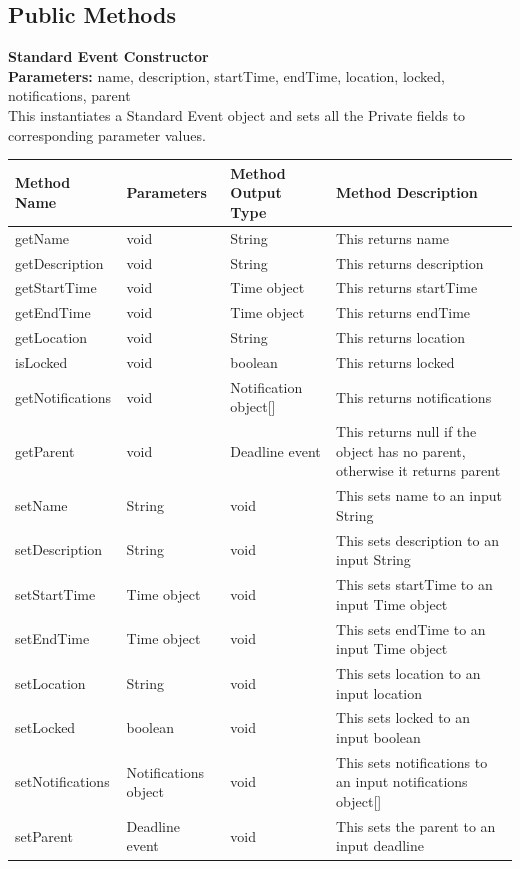\documentclass{scrreprt}
\begin{document}
\subsection{Public Methods}

\textbf{Standard Event Constructor} \\
\textbf{Parameters:} name, description, startTime, endTime, location, locked, notifications, parent \\
This instantiates a Standard Event object and sets all the Private fields to corresponding parameter values.

\begin{center}
\begin{longtable}{ | p{3cm} | p{3cm} | p{3cm} | p{5cm} | }
\hline
\textbf{Method Name} & \textbf {Parameters} & \textbf{Method Output Type} & \textbf{Method Description} \\
\hline
getName & void & String & This returns name \\
\hline
getDescription & void & String & This returns description \\
\hline
getStartTime & void & Time object & This returns startTime \\
\hline
getEndTime & void & Time object & This returns endTime \\
\hline
getLocation & void & String & This returns location \\
\hline
isLocked & void & boolean & This returns locked \\
\hline
getNotifications & void & Notification object[] & This returns notifications \\
\hline
getParent & void & Deadline event & This returns null if the object has no parent, otherwise it returns parent \\
\hline
setName & String & void & This sets name to an input String \\
\hline
setDescription & String & void & This sets description to an input String \\
\hline
setStartTime & Time object & void & This sets startTime to an input Time object \\
\hline
setEndTime & Time object & void & This sets endTime to an input Time object \\
\hline
setLocation & String & void & This sets location to an input location \\
\hline
setLocked & boolean & void & This sets locked to an input boolean \\
\hline
setNotifications & Notifications object & void & This sets notifications to an input notifications object[] \\
\hline
setParent & Deadline event & void & This sets the parent to an input deadline \\
\hline
\end{longtable}
\end{center}
\end{document}
